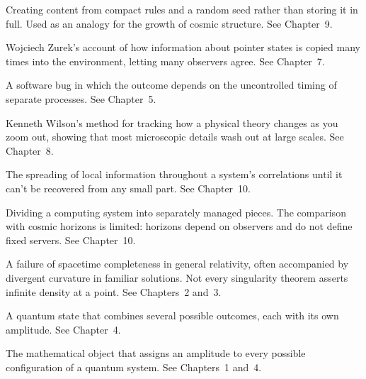 \begin{description}[
    style=nextline,
    leftmargin=2.2em,
    labelwidth=2em,
    labelsep=0.4em,
    itemsep=0.65em,
    parsep=0pt,
    topsep=0.25em
]
\item[Procedural generation] Creating content from compact rules and a random seed rather than storing it in full. Used as an analogy for the growth of cosmic structure. See Chapter~9.

\item[Quantum Darwinism] Wojciech Zurek's account of how information about pointer states is copied many times into the environment, letting many observers agree. See Chapter~7.

\item[Race condition] A software bug in which the outcome depends on the uncontrolled timing of separate processes. See Chapter~5.

\item[Renormalization group] Kenneth Wilson's method for tracking how a physical theory changes as you zoom out, showing that most microscopic details wash out at large scales. See Chapter~8.

\item[Scrambling] The spreading of local information throughout a system's correlations until it can't be recovered from any small part. See Chapter~10.

\item[Sharding] Dividing a computing system into separately managed pieces. The comparison with cosmic horizons is limited: horizons depend on observers and do not define fixed servers. See Chapter~10.

\item[Singularity] A failure of spacetime completeness in general relativity, often accompanied by divergent curvature in familiar solutions. Not every singularity theorem asserts infinite density at a point. See Chapters~2 and~3.

\item[Superposition] A quantum state that combines several possible outcomes, each with its own amplitude. See Chapter~4.

\item[Wavefunction] The mathematical object that assigns an amplitude to every possible configuration of a quantum system. See Chapters~1 and~4.

\end{description}
